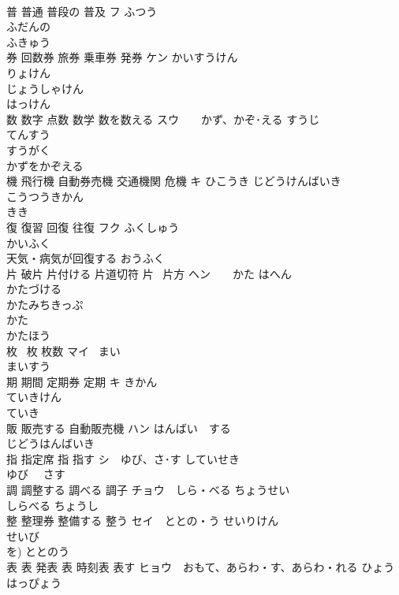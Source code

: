 \documentclass[8pt]{extreport}
\begin{document}
\begin{CJK}{UTF8}{min}
\\	普 普通 普段の 普及	フ ふつう　
\\	ふだんの 
\\	ふきゅう 
\\	券 回数券 旅券 乗車券 発券	ケン かいすうけん　
\\	りょけん 
\\	じょうしゃけん 
\\	はっけん 
\\	数 数字 点数 数学 数を数える	スウ　　かず、かぞ･える すうじ 
\\	てんすう　
\\	すうがく　
\\	かずをかぞえる　
\\	機 飛行機 自動券売機 交通機関 危機	キ ひこうき じどうけんばいき 
\\	こうつうきかん 
\\	きき 
\\	復 復習 回復 往復	フク ふくしゅう　
\\	かいふく 
\\	天気・病気が回復する おうふく　
\\	片 破片 片付ける 片道切符 片~ 片方	ヘン　　かた はへん　
\\	かたづける　
\\	かたみちきっぷ 
\\	かた~　
\\	かたほう 
\\	枚 ~枚 枚数	マイ ~まい 
\\	まいすう 
\\	期 期間 定期券 定期	キ きかん 
\\	ていきけん 
\\	ていき 
\\	販 販売する 自動販売機	ハン はんばい　する　
\\	じどうはんばいき　
\\	指 指定席 指 指す	シ　ゆび、さ･す していせき 
\\	ゆび　 さす　
\\	調 調整する 調べる 調子	チョウ　しら・ベる ちょうせい　
\\	しらべる ちょうし 
\\	整 整理券 整備する 整う	セイ　ととの・う せいりけん 
\\	せいび 
\\	を) ととのう 
\\	表 表 発表 表 時刻表 表す	ヒョウ　おもて、あらわ・す、あらわ・れる ひょう　
\\	はっぴょう　

\end{CJK}
\end{document}
